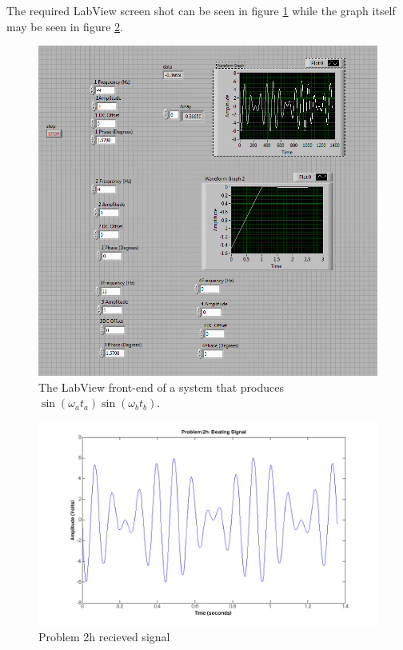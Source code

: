\documentclass{article}
\theoremstyle{plain}
\theoremstyle{definition}
\theoremstyle{remark}
\begin{document}
The required LabView screen shot can be seen in figure \ref{q2_h1} while the graph itself may be seen in figure \ref{q2_h2}.

\begin{figure}[h]
\begin{center}
\includegraphics[width=15cm]{problem2_h.png}
\end{center}
\caption{The LabView front-end of a system that produces $\sin(\omega_a t_a)\sin(\omega_b t_b) $.}
\label{q2_h1}
\end{figure}

\begin{figure}[h]
\begin{center}
\includegraphics[width = 15cm]{problem2h_plot.png}
\end{center}
\caption{Problem 2h recieved signal}
\label{q2_h2}
\end{figure}
\end{document}
